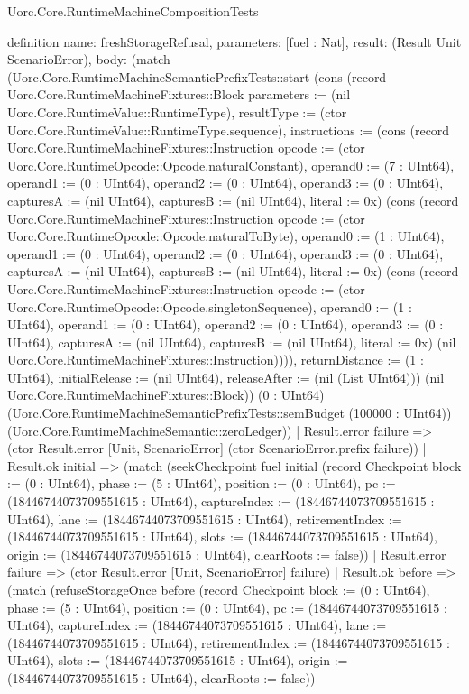 \begin{lexlean}{Uorc.Core.RuntimeMachineCompositionTests}
\begin{semanticmodule}
definition{
  name: freshStorageRefusal,
  parameters: [fuel : Nat],
  result: (Result Unit ScenarioError),
  body: (match (Uorc.Core.RuntimeMachineSemanticPrefixTests::start (cons (record Uorc.Core.RuntimeMachineFixtures::Block {parameters := (nil Uorc.Core.RuntimeValue::RuntimeType), resultType := (ctor Uorc.Core.RuntimeValue::RuntimeType.sequence), instructions := (cons (record Uorc.Core.RuntimeMachineFixtures::Instruction {opcode := (ctor Uorc.Core.RuntimeOpcode::Opcode.naturalConstant), operand0 := (7 : UInt64), operand1 := (0 : UInt64), operand2 := (0 : UInt64), operand3 := (0 : UInt64), capturesA := (nil UInt64), capturesB := (nil UInt64), literal := 0x}) (cons (record Uorc.Core.RuntimeMachineFixtures::Instruction {opcode := (ctor Uorc.Core.RuntimeOpcode::Opcode.naturalToByte), operand0 := (1 : UInt64), operand1 := (0 : UInt64), operand2 := (0 : UInt64), operand3 := (0 : UInt64), capturesA := (nil UInt64), capturesB := (nil UInt64), literal := 0x}) (cons (record Uorc.Core.RuntimeMachineFixtures::Instruction {opcode := (ctor Uorc.Core.RuntimeOpcode::Opcode.singletonSequence), operand0 := (1 : UInt64), operand1 := (0 : UInt64), operand2 := (0 : UInt64), operand3 := (0 : UInt64), capturesA := (nil UInt64), capturesB := (nil UInt64), literal := 0x}) (nil Uorc.Core.RuntimeMachineFixtures::Instruction)))), returnDistance := (1 : UInt64), initialRelease := (nil UInt64), releaseAfter := (nil (List UInt64))}) (nil Uorc.Core.RuntimeMachineFixtures::Block)) (0 : UInt64) (Uorc.Core.RuntimeMachineSemanticPrefixTests::semBudget (100000 : UInt64)) (Uorc.Core.RuntimeMachineSemantic::zeroLedger))
    | Result.error failure => (ctor Result.error [Unit, ScenarioError] (ctor ScenarioError.prefix failure))
    | Result.ok initial => (match (seekCheckpoint fuel initial (record Checkpoint {block := (0 : UInt64), phase := (5 : UInt64), position := (0 : UInt64), pc := (18446744073709551615 : UInt64), captureIndex := (18446744073709551615 : UInt64), lane := (18446744073709551615 : UInt64), retirementIndex := (18446744073709551615 : UInt64), slots := (18446744073709551615 : UInt64), origin := (18446744073709551615 : UInt64), clearRoots := false}))
      | Result.error failure => (ctor Result.error [Unit, ScenarioError] failure)
      | Result.ok before => (match (refuseStorageOnce before (record Checkpoint {block := (0 : UInt64), phase := (5 : UInt64), position := (0 : UInt64), pc := (18446744073709551615 : UInt64), captureIndex := (18446744073709551615 : UInt64), lane := (18446744073709551615 : UInt64), retirementIndex := (18446744073709551615 : UInt64), slots := (18446744073709551615 : UInt64), origin := (18446744073709551615 : UInt64), clearRoots := false}))
}
\end{semanticmodule}
\end{lexlean}
